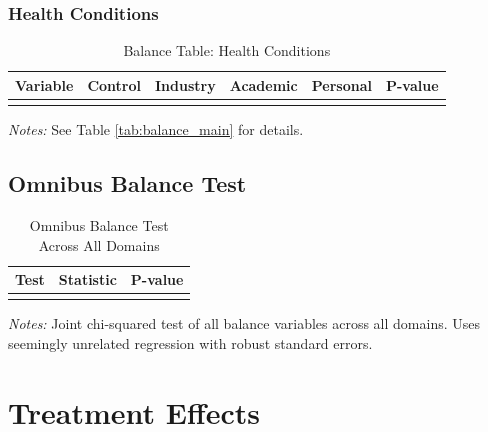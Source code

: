 \documentclass[11pt]{article}
\begin{document}
\subsubsection{Health Conditions}

\begin{table}[H]
\caption{Balance Table: Health Conditions}
\label{tab:balance_health}
\centering
\begin{tabular}{lccccc}
\toprule
Variable & Control & Industry & Academic & Personal & P-value \\
\midrule

\\
\bottomrule
\end{tabular}
\begin{minipage}{\textwidth}
\vspace{0.5em}
\footnotesize
\textit{Notes:} See Table \ref{tab:balance_main} for details.
\end{minipage}
\end{table}

\subsection{Omnibus Balance Test}

\begin{table}[H]
\caption{Omnibus Balance Test Across All Domains}
\label{tab:balance_omnibus}
\centering
\begin{tabular}{lccccc}
\toprule
Test & \multicolumn{4}{c}{Statistic} & P-value \\
\midrule

\\
\bottomrule
\end{tabular}
\begin{minipage}{\textwidth}
\vspace{0.5em}
\footnotesize
\textit{Notes:} Joint chi-squared test of all balance variables across all domains. Uses seemingly unrelated regression with robust standard errors.
\end{minipage}
\end{table}

\section{Treatment Effects}
\end{document}
